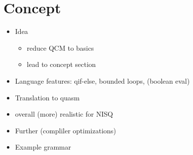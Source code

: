 \chapter{Concept}
\begin{itemize}
    \item Idea  
    \begin{itemize}
        \item reduce QCM to basics
        \item lead to concept section
    \end{itemize}
    \item Language features: qif-else, bounded loops, (boolean eval)
    \item Translation to quasm
    \item overall (more) realistic for NISQ 
    \item Further (compliler optimizations)
    \item Example grammar
\end{itemize}


